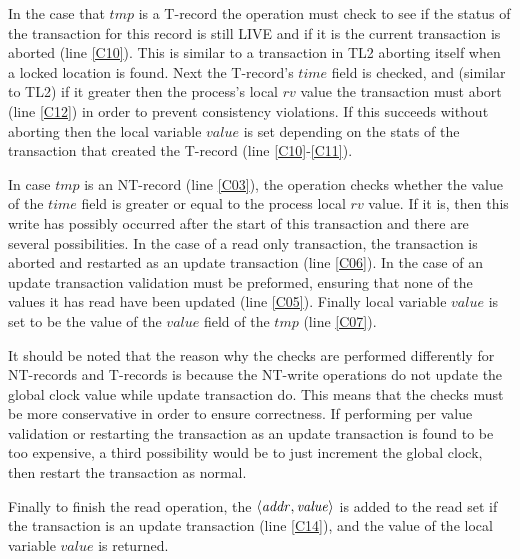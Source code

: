 \documentclass[11pt,letterpaper]{article}
\begin{document}
In the case that $\mathit{tmp}$ is a T-record the operation must check to see
if the status of the transaction for this record is still LIVE and if it is
the current transaction is aborted (line \ref{C10}).
This is similar to a transaction in TL2 aborting itself when a locked location is found.
Next the T-record's $\mathit{time}$ field is checked, and (similar to TL2) if it 
greater then the process's local $\mathit{rv}$ value the transaction must abort 
(line \ref{C12}) in order to prevent consistency violations.
If this succeeds without aborting then the local variable $\mathit{value}$
is set depending on the stats of the transaction that created the T-record (line \ref{C10}-\ref{C11}).

In case $\mathit{tmp}$ is an 
NT-record (line \ref{C03}), the operation
checks whether the value of the $\mathit{time}$ field is
greater or equal to the process local $\mathit{rv}$ value.
If it is, then this write has possibly occurred after the start of this
transaction and there are several possibilities.
In the case of a read only transaction, the transaction
is aborted and restarted as an update transaction (line \ref{C06}).
In the case of an update transaction validation must be preformed, ensuring
that none of the values it has read have been updated (line \ref{C05}).
Finally local variable $\mathit{value}$ is set to be the value
of the $\mathit{value}$ field of the $\mathit{tmp}$ (line \ref{C07}).

It should be noted that the reason why the checks are performed differently
for NT-records and T-records is because the NT-write operations do not
update the global clock value while update transaction do.
This means that the checks must be more conservative in order to ensure correctness.
If performing per value validation or restarting the transaction as an update transaction
is found to be too expensive, a third possibility would be to just increment the global
clock, then restart the transaction as normal.

Finally to finish the read operation, the $\left \langle \mathit{addr, value} \right \rangle $
is added to the read set if the transaction is an update transaction (line \ref{C14}),
and the value of the local variable $\mathit{value}$  is returned.
\end{document}
